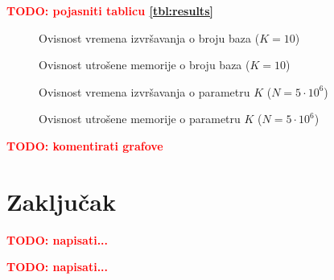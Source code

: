 \documentclass[times, utf8, seminar, numeric]{fer}
\newcommand\todo[1]{\textbf{\textcolor{red}{TODO: #1}}}
\begin{document}
\todo{pojasniti tablicu \ref{tbl:results}} \\

\begin{figure}[!h]
	\centering
	\def\svgwidth{.7\columnwidth}
	
  \caption{Ovisnost vremena izvršavanja o broju baza ($K = 10$)}
\end{figure}

\begin{figure}[!h]
	\centering
	\def\svgwidth{.7\columnwidth}
	
  \caption{Ovisnost utrošene memorije o broju baza ($K = 10$)}
\end{figure}

\begin{figure}[!h]
	\centering
	\def\svgwidth{.7\columnwidth}
	
  \caption{Ovisnost vremena izvršavanja o parametru $K$ ($N = 5 \cdot 10^6$)}
\end{figure}

\begin{figure}[!h]
	\centering
	\def\svgwidth{.7\columnwidth}
	
  \caption{Ovisnost utrošene memorije o parametru $K$ ($N = 5 \cdot 10^6$)}
\end{figure}

\todo{komentirati grafove} \\

\chapter{Zaključak}
\todo{napisati...}




\begin{sazetak}
  \todo{napisati...}

\end{sazetak}
\end{document}
